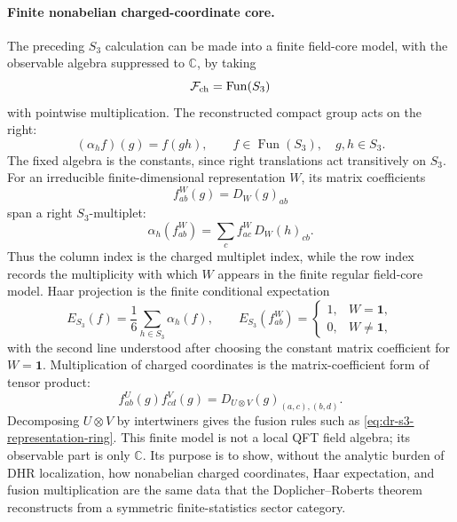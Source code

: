 \paragraph{Finite nonabelian charged-coordinate core.}
The preceding \(S_3\) calculation can be made into a finite field-core model,
with the observable algebra suppressed to \(\mathbb C\), by taking
\[
  \mathcal F_{\rm ch}=\operatorname{Fun}(S_3)
\]
with pointwise multiplication.  The reconstructed compact group acts on the
right:
\begin{equation}
  (\alpha_h f)(g)=f(gh),
  \qquad f\in\operatorname{Fun}(S_3),\quad g,h\in S_3 .
  \label{eq:dr-s3-regular-right-action}
\end{equation}
The fixed algebra is the constants, since right translations act transitively
on \(S_3\).  For an irreducible finite-dimensional representation \(W\), its matrix
coefficients
\[
  f^W_{ab}(g)=D_W(g)_{ab}
\]
span a right \(S_3\)-multiplet:
\begin{equation}
  \alpha_h(f^W_{ab})
  =
  \sum_c f^W_{ac}\,D_W(h)_{cb}.
  \label{eq:dr-s3-matrix-coefficient-right-action}
\end{equation}
Thus the column index is the charged multiplet index, while the row index
records the multiplicity with which \(W\) appears in the finite regular
field-core model.  Haar projection is the finite conditional expectation
\begin{equation}
  E_{S_3}(f)
  =
  \frac1{6}\sum_{h\in S_3}\alpha_h(f),
  \qquad
  E_{S_3}(f^W_{ab})=
  \begin{cases}
    1,& W=\mathbf 1,\\
    0,& W\ne\mathbf 1,
  \end{cases}
  \label{eq:dr-s3-regular-haar-expectation}
\end{equation}
with the second line understood after choosing the constant matrix coefficient
for \(W=\mathbf1\).  Multiplication of charged coordinates is the
matrix-coefficient form of tensor product:
\begin{equation}
  f^U_{ab}(g)f^V_{cd}(g)
  =
  D_{U\otimes V}(g)_{(a,c),(b,d)} .
  \label{eq:dr-s3-matrix-coefficient-product}
\end{equation}
Decomposing \(U\otimes V\) by intertwiners gives the fusion rules such as
\eqref{eq:dr-s3-representation-ring}.  This finite model is not a local QFT
field algebra; its observable part is only \(\mathbb C\).  Its purpose is to
show, without the analytic burden of DHR localization, how nonabelian charged
coordinates, Haar expectation, and fusion multiplication are the same data
that the Doplicher--Roberts theorem reconstructs from a symmetric
finite-statistics sector category.

